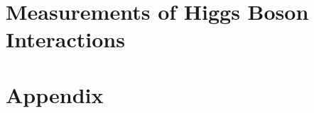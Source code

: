 

\part{Measurements of Higgs Boson Interactions}






% 

\clearpage
{}
\appendix
\part*{Appendix}




\printbibliography
% 
% 

